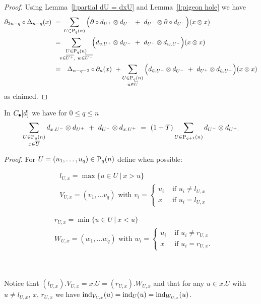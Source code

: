\begin{proof}
	Using Lemma~\ref{l:partial dU = dxU} and Lemma~\ref{l:pigeon hole} we have
	\begin{equation*}
	\begin{split}
	\partial_{2n-q} \circ \Delta_{n - q} (x) \ = & \
	\sum_{U \in \P_q(n)} \Big( \partial \circ d_{U^+} \tensor d_{U^-}\ +\ d_{U^-} \tensor \partial \circ d_{U^-} \Big) (x \otimes x) \\ = & \!\!
	\sum_{\substack{U \in \P_q(n) \\ v \in \overline{U^+},\ w \in \overline{U^-} } }\!\! \Big( d_{v.U^+} \tensor d_{U^-}\ +\ d_{U^+} \tensor d_{w.U^-}\Big) (x \otimes x) \\ = &
	\quad \Delta_{n-q-2} \circ \partial_n (x) \ + 
	\sum_{\substack{U\in\P_{q}(n) \\ \bar u \in \overline{U}}} \Big( d_{\bar u.U^+} \tensor d_{U^-}\ +\ d_{U^+} \tensor d_{\bar u.U^-}\Big) (x \otimes x)
	\end{split}
	\end{equation*}
	as claimed.
\end{proof}

\begin{lemma} \label{lemma4: existence}  
	In $\chains[d]$ we have for $0 \leq q \leq n$
	\begin{equation} \label{lemma4: existence: eq1}
	\sum_{\substack{U \in \P_{q}(n) \\ x \in \overline{U}}} d_{x.U^-} \tensor d_{U^+}\ +\ d_{U^-} \tensor d_{x.U^+}\ = \
	(1+T) \sum_{U \in \P_{q+1}(n)} d_{U^-} \tensor d_{U^+.}
	\end{equation}
\end{lemma}

\textit{Proof.}
For $U = (u_1, \dots, u_q) \in \P_{q}(n)$ define when possible:\\
\begin{minipage}{.5\textwidth}
	\begin{align*}
	& l_{U,x} = \max\{u\in U\ |\ x>u\} \\
	& V_{U,x} = (v_1, \dots v_q) \text{ with }
	v_i = 
	\begin{cases}
	u_i & \text{ if } u_i \neq l_{U,x} \\
	x	& \text{ if } u_i = l_{U,x}
	\end{cases}
	\end{align*} 
\end{minipage}
\begin{minipage}{.5\textwidth}
	\begin{align*}
	& r_{U,x} = \min\{u\in U\ |\ x<u\} \\
	& W_{U,x} = (w_1, \dots w_q) \text{ with }
	w_i = 
	\begin{cases}
	u_i & \text{ if } u_i \neq r_{U,x} \\
	x	& \text{ if } u_i = r_{U,x}.
	\end{cases}
	\end{align*}
\end{minipage}\\ \\
Notice that $(l_{U,x}).V_{U,x} = x.U = (r_{U,x}).W_{U,x}$ and that for any $u \in x.U$ with $u \neq l_{U,x},\, x,\, r_{U,x}$ we have $\ind_{V_{U,x}}(u) = \ind_{U}(u) = \ind_{W_{U,x}}(u)$.

